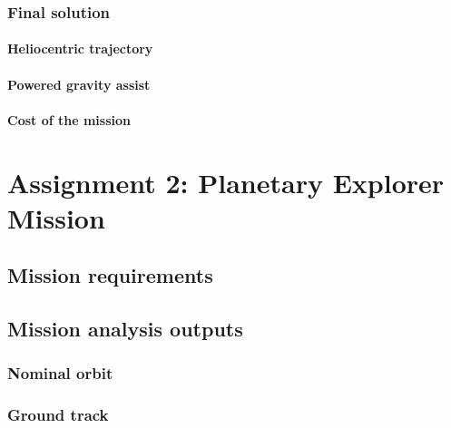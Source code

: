 \documentclass[11pt,a4paper]{report}
\begin{document}
\section{Final solution}

\subsection{Heliocentric trajectory}

\subsection{Powered gravity assist}

\subsection{Cost of the mission}

\part{Assignment 2: Planetary Explorer Mission}

\chapter{Mission requirements}

\chapter{Mission analysis outputs}

\section{Nominal orbit}

\section{Ground track}
\end{document}
